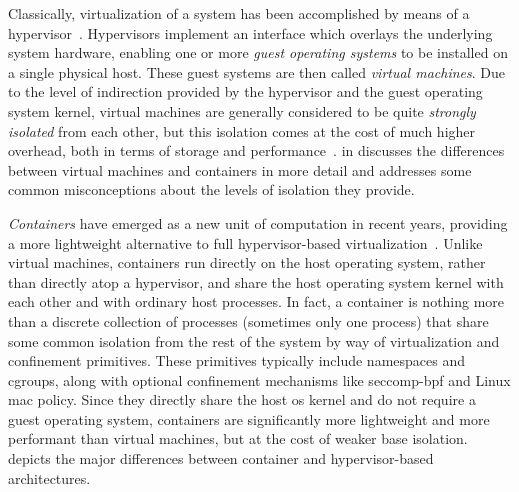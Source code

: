 Classically, virtualization of a system has been accomplished by means of
a hypervisor~\cite{eder2016_hypervisor_container, sultan2019_container_security}.
Hypervisors implement an interface which overlays the underlying system hardware,
enabling one or more \textit{guest operating systems} to be installed on a single physical
host. These guest systems are then called \textit{virtual machines}. Due to the level of
indirection provided by the hypervisor and the guest operating system kernel, virtual
machines are generally considered to be quite \textit{strongly isolated} from each other,
but this isolation comes at the cost of much higher overhead, both in terms of storage and
performance~\cite{eder2016_hypervisor_container, sultan2019_container_security}.
 in  discusses the differences between
virtual machines and containers in more detail and addresses some common misconceptions
about the levels of isolation they provide.



\textit{Containers} have emerged as a new unit of computation in recent years, providing
a more lightweight alternative to full hypervisor-based
virtualization~\cite{sultan2019_container_security, eder2016_hypervisor_container}.
Unlike virtual machines, containers run directly on the host operating system, rather than
directly atop a hypervisor, and share the host operating system kernel with each other and
with ordinary host processes. In fact, a container is nothing more than a discrete
collection of processes (sometimes only one process) that share some common isolation from
the rest of the system by way of virtualization and confinement primitives. These
primitives typically include namespaces and cgroups, along with optional confinement
mechanisms like seccomp-\gls{bpf} and Linux \gls{mac} policy. Since they directly share
the host \gls{os} kernel and do not require a guest operating system, containers are
significantly more lightweight and more performant than virtual machines, but at the cost of
weaker base isolation.  depicts the major differences between container and
hypervisor-based architectures.

